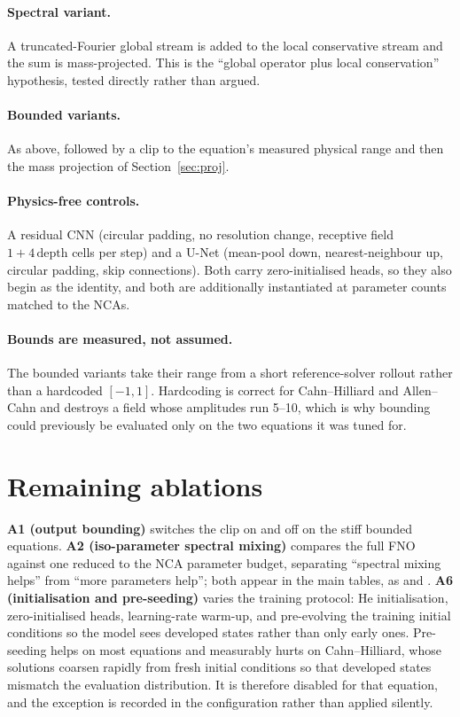 \paragraph{Spectral variant.} A truncated-Fourier global stream is added to the local
conservative stream and the sum is mass-projected. This is the ``global operator plus
local conservation'' hypothesis, tested directly rather than argued.

\paragraph{Bounded variants.} As above, followed by a clip to the equation's measured
physical range and then the mass projection of Section~\ref{sec:proj}.

\paragraph{Physics-free controls.} A residual CNN (circular padding, no resolution change,
receptive field $1 + 4\,\text{depth}$ cells per step) and a U-Net (mean-pool down,
nearest-neighbour up, circular padding, skip connections). Both carry zero-initialised
heads, so they also begin as the identity, and both are additionally instantiated at
parameter counts matched to the NCAs.

\paragraph{Bounds are measured, not assumed.} The bounded variants take their range from a
short reference-solver rollout rather than a hardcoded $[-1,1]$. Hardcoding is correct for
Cahn--Hilliard and Allen--Cahn and destroys a field whose amplitudes run 5--10, which is
why bounding could previously be evaluated only on the two equations it was tuned for.

\section{Remaining ablations}\label{app:ablations}

\textbf{A1 (output bounding)} switches the clip on and off on the stiff bounded equations.
\textbf{A2 (iso-parameter spectral mixing)} compares the full FNO against one reduced to
the NCA parameter budget, separating ``spectral mixing helps'' from ``more parameters
help''; both appear in the main tables, as  and . \textbf{A6
(initialisation and pre-seeding)} varies the training protocol: He initialisation,
zero-initialised heads, learning-rate warm-up, and pre-evolving the training initial
conditions so the model sees developed states rather than only early ones. Pre-seeding
helps on most equations and measurably hurts on Cahn--Hilliard, whose solutions coarsen
rapidly from fresh initial conditions so that developed states mismatch the evaluation
distribution. It is therefore disabled for that equation, and the exception is recorded in
the configuration rather than applied silently.

